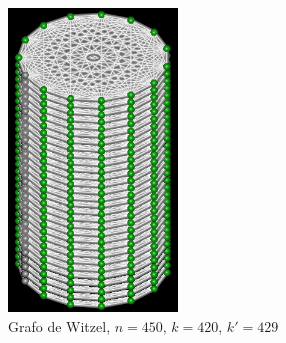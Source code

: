 \begin{figure}[htb]
\centering
\includegraphics[width=0.4\textwidth]{img/witzel.png}
\caption{Grafo de Witzel, $n=450$, $k=420$, $k'=429$}
\label{fig:example-witzel}
\end{figure}

